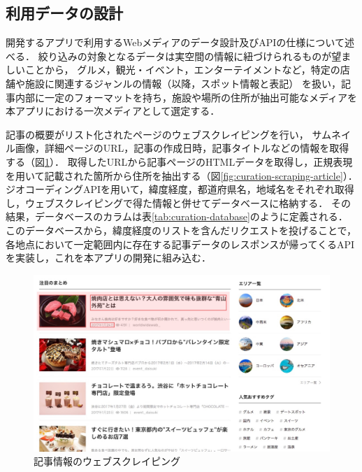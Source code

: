 \documentclass[a4paper]{jsarticle}
\begin{document}
\begin{enumerate}
\begin{enumerate}

\subsection{利用データの設計}
開発するアプリで利用するWebメディアのデータ設計及びAPIの仕様について述べる．
絞り込みの対象となるデータは実空間の情報に紐づけられるものが望ましいことから，
グルメ，観光・イベント，エンターテイメントなど，特定の店舗や施設に関連するジャンルの情報（以降，スポット情報と表記）
を扱い，記事内部に一定のフォーマットを持ち，施設や場所の住所が抽出可能なメディアを本アプリにおける一次メディアとして選定する．


記事の概要がリスト化されたページのウェブスクレイピングを行い，
サムネイル画像，詳細ページのURL，記事の作成日時，記事タイトルなどの情報を取得する（図\ref{fig:curation-scraping-list}）．
取得したURLから記事ページのHTMLデータを取得し，正規表現を用いて記載された箇所から住所を抽出する（図\ref{fig:curation-scraping-article}）．
ジオコーディングAPIを用いて，緯度経度，都道府県名，地域名をそれぞれ取得し，ウェブスクレイピングで得た情報と併せてデータベースに格納する．
その結果，データベースのカラムは表\ref{tab:curation-database}のように定義される．
このデータベースから，緯度経度のリストを含んだリクエストを投げることで，各地点において一定範囲内に存在する記事データのレスポンスが帰ってくるAPIを実装し，これを本アプリの開発に組み込む．

\fifigure
\begin{figure}[H]
  \begin{center}
    \includegraphics[width=0.95\hsize]{./images/curation_scraping_list.jpg}
    \caption{記事情報のウェブスクレイピング}
    \label{fig:curation-scraping-list}
  \end{center}
\end{figure}
\fi


\end{enumerate}
\end{enumerate}
\end{document}
